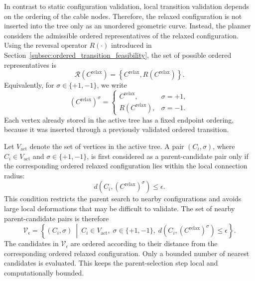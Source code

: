 \documentclass{pas}
\begin{document}
In contrast to static configuration validation, local transition validation
depends on the ordering of the cable nodes. Therefore, the relaxed configuration
is not inserted into the tree only as an unordered geometric curve. Instead, the
planner considers the admissible ordered representatives of the relaxed
configuration. Using the reversal operator \(R(\cdot)\) introduced in
Section~\ref{subsec:ordered_transition_feasibility}, the set of possible ordered
representatives is
\begin{equation}
\mathcal{R}
\left(
C^{\mathrm{relax}}
\right)
=
\left\{
C^{\mathrm{relax}},
R\left(C^{\mathrm{relax}}\right)
\right\}.
\label{eq:relaxed_ordered_representatives}
\end{equation}
Equivalently, for \(\sigma\in\{+1,-1\}\), we write
\begin{equation}
\left(C^{\mathrm{relax}}\right)^{\sigma}
=
\begin{cases}
C^{\mathrm{relax}}, & \sigma=+1,\\
R\left(C^{\mathrm{relax}}\right), & \sigma=-1.
\end{cases}
\label{eq:relaxed_order_variable}
\end{equation}
Each vertex already stored in the active tree has a fixed endpoint ordering,
because it was inserted through a previously validated ordered transition.

Let \(V_{\mathrm{act}}\) denote the set of vertices in the active tree. A pair
\(\left(C_i,\sigma\right)\), where \(C_i\in V_{\mathrm{act}}\) and
\(\sigma\in\{+1,-1\}\), is first considered as a parent-candidate pair only if
the corresponding ordered relaxed configuration lies within the local connection
radius:
\begin{equation}
d
\left(
C_i,
\left(C^{\mathrm{relax}}\right)^{\sigma}
\right)
\leq
\epsilon .
\label{eq:parent_distance_filter}
\end{equation}
This condition restricts the parent search to nearby configurations and avoids
large local deformations that may be difficult to validate. The set of nearby
parent-candidate pairs is therefore
\begin{equation}
\mathcal{V}_{\epsilon}
=
\left\{
\left(C_i,\sigma\right)
\ \middle|\
C_i\in V_{\mathrm{act}},
\;
\sigma\in\{+1,-1\},
\;
d
\left(
C_i,
\left(C^{\mathrm{relax}}\right)^{\sigma}
\right)
\leq
\epsilon
\right\}.
\label{eq:nearby_parent_set}
\end{equation}
The candidates in \(\mathcal{V}_{\epsilon}\) are ordered according to their
distance from the corresponding ordered relaxed configuration. Only a bounded
number of nearest candidates is evaluated. This keeps the parent-selection step
local and computationally bounded.
\end{document}
